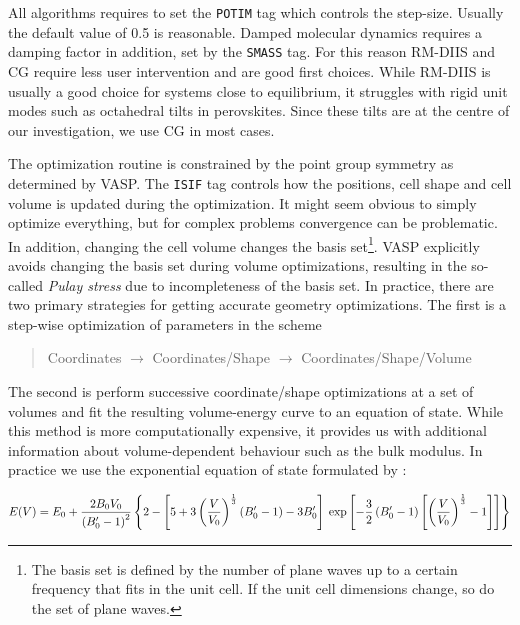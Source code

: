 \noindent All algorithms requires to set the \texttt{POTIM} tag which controls the step-size. Usually the default value of 0.5 is reasonable. Damped molecular dynamics requires a damping factor in addition, set by the \texttt{SMASS} tag. For this reason RM-DIIS and CG require less user intervention and are good first choices. While RM-DIIS is usually a good choice for systems close to equilibrium, it struggles with rigid unit modes such as octahedral tilts in perovskites. Since these tilts are at the centre of our investigation, we use CG in most cases.

The optimization routine is constrained by the point group symmetry as determined by VASP. The \texttt{ISIF} tag controls how the positions, cell shape and cell volume is updated during the optimization. It might seem obvious to simply optimize everything, but for complex problems convergence can be problematic. In addition, changing the cell volume changes the basis set\footnote{The basis set is defined by the number of plane waves up to a certain frequency that fits in the unit cell. If the unit cell dimensions change, so do the set of plane waves.}. VASP explicitly avoids changing the basis set during volume optimizations, resulting in the so-called \emph{Pulay stress} due to incompleteness of the basis set. In practice, there are two primary strategies for getting accurate geometry optimizations. The first is a step-wise optimization of parameters in the scheme

\begin{quote}
	Coordinates $\rightarrow$ Coordinates/Shape $\rightarrow$ Coordinates/Shape/Volume
\end{quote}

\noindent The second is perform successive coordinate/shape optimizations at a set of volumes and fit the resulting volume-energy curve to an equation of state. While this method is more computationally expensive, it provides us with additional information about volume-dependent behaviour such as the bulk modulus. In practice we use the exponential equation of state formulated by \citeauthor{Vinet1987}\cite{Vinet1987}:

\begin{equation*}
\tiny
E(V) = E_0 + \frac{2B_0V_0}{\left(B_0^\prime-1\right)^2}\left\lbrace 2 -\left[ 5 + 3\left( \frac{V}{V_0}\right)^\frac{1}{3} (B_0^\prime -1)  -3B_0^\prime \right] \right. \left. \exp \left[ -\frac{3}{2} \left( B_0^\prime-1\right)\left[\left( \frac{V}{V_0}\right)^\frac{1}{3} -1\right]\right]\right\rbrace
\end{equation*}

